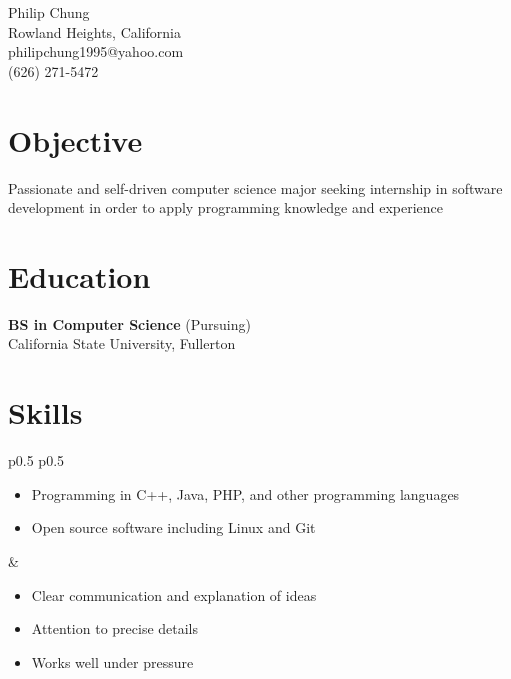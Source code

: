 \documentclass[10pt]{article}
\newcommand{\baseheader}[3]{#1 \marginpar{\raggedleft #2} \\ #3}
\begin{document}
	\begin{center}
		{\LARGE Philip Chung} \\
		Rowland Heights, California \\
		philipchung1995@yahoo.com \\
		(626) 271-5472 \\
	\end{center}

	\section*{Objective}

	Passionate and self-driven computer science major seeking internship in software development in order to apply programming knowledge and experience

	\section*{Education}

	\baseheader{\textbf{BS in Computer Science} (Pursuing)}{1/2018}{California State University, Fullerton}

	\section*{Skills}

	\begin{tabular}{p{0.5\textwidth} p{0.5\textwidth}}
		\begin{minipage}[t]{\linewidth}
			\raggedright
			\begin{itemize}[nosep]
				\item Programming in C++, Java, PHP, and other programming languages
				\item Open source software including Linux and Git
			\end{itemize}
		\end{minipage}
		&
		\begin{minipage}[t]{\linewidth}
			\raggedright
			\begin{itemize}[nosep]
				\item Clear communication and explanation of ideas
				\item Attention to precise details
				\item Works well under pressure
			\end{itemize}
		\end{minipage}
	\end{tabular}
\end{document}
